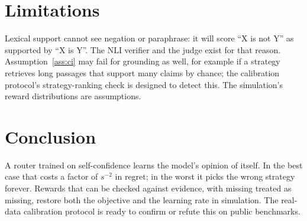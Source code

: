 \documentclass[conference]{IEEEtran}
\theoremstyle{definition}
\theoremstyle{remark}
\begin{document}
\section{Limitations}
Lexical support cannot see negation or paraphrase: it will score ``X is not Y'' as supported by ``X is Y''. The NLI verifier and the judge exist for that reason. Assumption~\ref{ass:ci} may fail for grounding as well, for example if a strategy retrieves long passages that support many claims by chance; the calibration protocol's strategy-ranking check is designed to detect this. The simulation's reward distributions are assumptions.

\section{Conclusion}
A router trained on self-confidence learns the model's opinion of itself. In the best case that costs a factor of $s^{-2}$ in regret; in the worst it picks the wrong strategy forever. Rewards that can be checked against evidence, with missing treated as missing, restore both the objective and the learning rate in simulation. The real-data calibration protocol is ready to confirm or refute this on public benchmarks.
\end{document}
